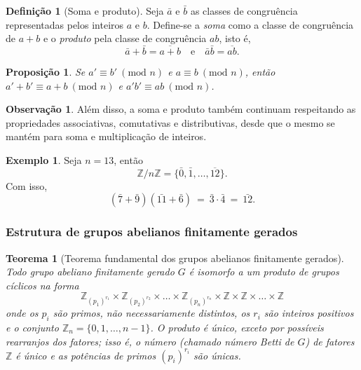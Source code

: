 \documentclass[a4paper,12pt]{report}
\theoremstyle{plain}
\newtheorem{teorema}{Teorema}[section]
\newtheorem{proposicao}{Proposição}[section]
\theoremstyle{definition}
\newtheorem{definicao}{Definição}[section]
\newtheorem{observacao}{Observação}[section]
\newtheorem{exemplo}{Exemplo}[section]
\begin{document}
\begin{definicao}[Soma e produto]
	Seja \(\bar a\) e \(\bar b\) as classes de congruência representadas pelos inteiros \(a\) e \(b\). Define-se a \emph{soma} como a classe de congruência de \(a+b\) e o \emph{produto} pela classe de congruência \(ab\), isto é, \[\bar a + \bar b = \overline{a+b} \quad \text{e}\quad \bar a\bar b = \overline{ab}.\]	
\end{definicao}

\begin{proposicao}
	Se \(a' \equiv b'\ (\text{mod }n)\) e \(a\equiv b\ (\text{mod }n)\), então
	\(a' + b' \equiv a+b\ (\text{mod }n)\) e
	\(a'b' \equiv ab \ (\text{mod }n)\).
\end{proposicao}

\begin{observacao}
	Além disso, a soma e produto também continuam respeitando as
	propriedades associativas, comutativas e distributivas, desde que o
	mesmo se mantém para soma e multiplicação de inteiros.
\end{observacao}

\begin{exemplo}
	Seja \(n = 13\), então
	\[\mathbb{Z}/n\mathbb{Z} =  \{\bar{0}, \bar{1},\dots,\overline{12}\}.\]
	Com isso,
	\[(\bar 7 + \bar 9)(\bar{11} + \bar 6) \ = \ \bar 3 \cdot \bar 4 \ = \ \bar{12}.\]
\end{exemplo}


\subsubsection{Estrutura de grupos abelianos finitamente gerados}

\begin{teorema}[Teorema fundamental dos grupos abelianos finitamente gerados] \label{teo:abelianfinitelygenerately}
	Todo grupo abeliano finitamente gerado $G$ é isomorfo a um produto de grupos cíclicos na forma $$\mathbb{Z}_{(p_1)^{r_1}}\times\mathbb{Z}_{(p_2)^{r_2}}\times\dots\times\mathbb{Z}_{(p_n)^{r_n}}\times\mathbb{Z}\times\mathbb{Z}\times\dots\times\mathbb{Z} $$ onde os $p_i$ são primos, não necessariamente distintos, os $r_i$ são inteiros positivos e o conjunto $\mathbb{Z}_n = \{0,1,\dots,n-1\}$. O produto é único, exceto por possíveis rearranjos dos fatores; isso é, o número (chamado \emph{número Betti de $G$}) de fatores $\mathbb{Z}$ é único e as potências de primos $(p_i)^{r_i}$ são únicas.
\end{teorema}
\end{document}
